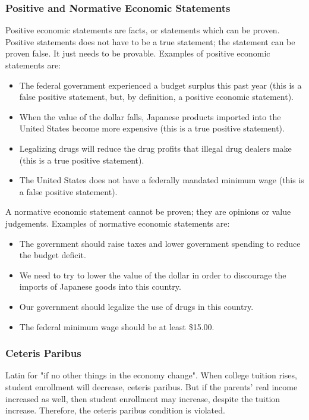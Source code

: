 \documentclass[a4paper, 12pt] {article}
\begin{document}
\subsubsection{Positive and Normative Economic Statements}
Positive economic statements are facts, or statements which can be proven. 
Positive statements does not have to be a true statement; the statement can be
proven false. It just needs to be provable. Examples of positive economic 
statements are:
\begin{itemize}
    \item The federal government experienced a budget surplus this past year
        (this is a false positive statement, but, by definition, a positive
        economic statement).

    \item When the value of the dollar falls, Japanese products imported into
        the United States become more expensive (this is a true positive statement).

    \item Legalizing drugs will reduce the drug profits that illegal drug dealers
        make (this is a true positive statement).

    \item The United States does not have a federally mandated minimum wage
        (this is a false positive statement).
\end{itemize}

A normative economic statement cannot be proven; they are opinions or value 
judgements. Examples of normative economic statements are:
\begin{itemize}
    \item The government should raise taxes and lower government spending to
        reduce the budget deficit.

    \item We need to try to lower the value of the dollar in order to discourage
        the imports of Japanese goods into this country.

    \item Our government should legalize the use of drugs in this country.

    \item The federal minimum wage should be at least \$15.00.
\end{itemize}

\subsubsection{Ceteris Paribus}
Latin for "if no other things in the economy change". When college tuition rises,
student enrollment will decrease, ceteris paribus. But if the parents' real income
increased as well, then student enrollment may increase, despite the tuition
increase. Therefore, the ceteris paribus condition is violated.
\end{document}
